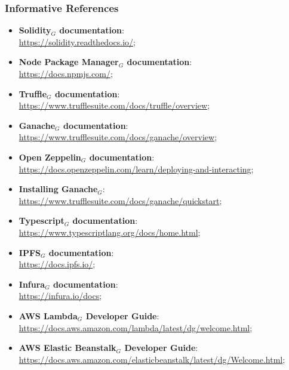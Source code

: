 		\subsubsection{Informative References}
			\begin{itemize}
				\item \textbf{Solidity$_{G}$ documentation}: \\
				\url{https://solidity.readthedocs.io/};

				\item \textbf{Node Package Manager$_{G}$ documentation}: \\
				\url{https://docs.npmjs.com/};

				\item \textbf{Truffle$_{G}$ documentation}: \\
				\url{https://www.trufflesuite.com/docs/truffle/overview};

				\item \textbf{Ganache$_{G}$ documentation}: \\
				\url{https://www.trufflesuite.com/docs/ganache/overview};

				\item \textbf{Open Zeppelin$_{G}$ documentation}: \\
				\url{https://docs.openzeppelin.com/learn/deploying-and-interacting};

				\item \textbf{Installing Ganache$_{G}$}: \\
				\url{https://www.trufflesuite.com/docs/ganache/quickstart};

				\item \textbf{Typescript$_{G}$ documentation}: \\
				\url{https://www.typescriptlang.org/docs/home.html};

				\item \textbf{IPFS$_{G}$ documentation}: \\
				\url{https://docs.ipfs.io/};

				\item \textbf{Infura$_{G}$ documentation}: \\
				\url{https://infura.io/docs};

				\item \textbf{AWS Lambda$_{G}$ Developer Guide}: \\
				\url{https://docs.aws.amazon.com/lambda/latest/dg/welcome.html};

				\item \textbf{AWS Elastic Beanstalk$_{G}$ Developer Guide}: \\
				\url{https://docs.aws.amazon.com/elasticbeanstalk/latest/dg/Welcome.html};


\end{itemize}
